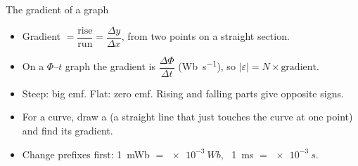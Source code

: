 \begin{toolkit}{The gradient of a graph}
\begin{itemize}
  \item Gradient $= \dfrac{\text{rise}}{\text{run}} = \dfrac{\Delta y}{\Delta x}$,
        from two points on a straight section.
  \item On a $\Phi$--$t$ graph the gradient is $\dfrac{\Delta\Phi}{\Delta t}$
        (\si{Wb.s^{-1}}), so $\lvert\varepsilon\rvert = N \times \text{gradient}$.
  \item Steep: big emf. Flat: zero emf. Rising and falling parts give opposite
        signs.
  \item For a curve, draw a  (a straight line that just touches the
        curve at one point) and find its gradient.
  \item Change prefixes first: \qty{1}{mWb} $= \qty{e-3}{Wb}$, \
        \qty{1}{ms} $= \qty{e-3}{s}$.
\end{itemize}
\end{toolkit}

